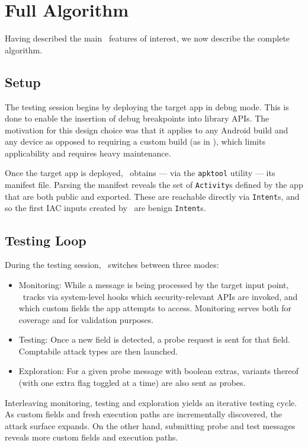 \section{Full Algorithm}

Having described the main \Tool\ features of interest, we now describe the complete algorithm.

\subsection{Setup}

The testing session begins by deploying the target app in debug mode. This is done to enable the insertion of debug breakpoints into library APIs. The motivation for this design choice was that it applies to any Android build and any device as opposed to requiring a custom build (as in \cite{TaintDroid}), which limits applicability and requires heavy maintenance.

Once the target app is deployed, \Tool\ obtains --- via the {\tt apktool} utility --- its manifest file. Parsing the manifest reveals the set of {\tt Activity}s defined by the app that are both public and exported. These are reachable directly via {\tt Intent}s, and so the first IAC inputs created by \Tool\ are benign {\tt Intent}s.

\subsection{Testing Loop}

During the testing session, \Tool\ switches between three modes:
\begin{itemize}
	\item Monitoring: While a message is being processed by the target input point, \Tool\ tracks via system-level hooks which security-relevant APIs are invoked, and which custom fields the app attempts to access. Monitoring serves both for coverage and for validation purposes.
	\item Testing: Once a new field is detected, a probe request is sent for that field. Comptabile attack types are then launched. 
	\item Exploration: For a given probe message with boolean extras, variants thereof (with one extra flag toggled at a time) are also sent as probes.
\end{itemize}
Interleaving monitoring, testing and exploration yields an iterative testing cycle. As custom fields and fresh execution paths are incrementally discovered, the attack surface expands. On the other hand, submitting probe and test messages reveals more custom fields and execution paths. 

